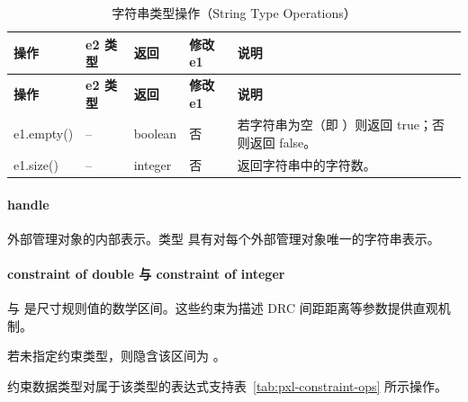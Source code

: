 \begin{longtable}{@{}>{\raggedright\arraybackslash\ttfamily}p{} p{} p{} p{} p{}@{}}
\caption{字符串类型操作（String Type Operations）}\label{tab:pxl-string-ops}\\
\toprule
\textbf{\textrm{操作}} & \textbf{\textrm{e2 类型}} & \textbf{\textrm{返回}} & \textbf{\textrm{修改 e1}} & \textbf{\textrm{说明}} \\
\midrule
\endfirsthead
\toprule
\textbf{\textrm{操作}} & \textbf{\textrm{e2 类型}} & \textbf{\textrm{返回}} & \textbf{\textrm{修改 e1}} & \textbf{\textrm{说明}} \\
\midrule
\endhead
\bottomrule
\endfoot
e1.empty() & -- & boolean & 否 & 若字符串为空（即 \cmd{""}）则返回 true；否则返回 false。 \\
e1.size() & -- & integer & 否 & 返回字符串中的字符数。 \\
\end{longtable}

\paragraph{handle}

外部管理对象的内部表示。类型  具有对每个外部管理对象唯一的字符串表示。

\paragraph{constraint of double 与 constraint of integer}

 与  是尺寸规则值的数学区间。这些约束为描述 DRC 间距距离等参数提供直观机制。

若未指定约束类型，则隐含该区间为 。

约束数据类型对属于该类型的表达式支持表~\ref{tab:pxl-constraint-ops} 所示操作。

